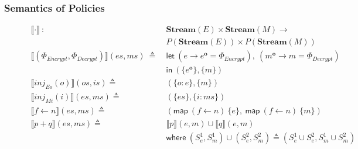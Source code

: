 \documentclass[12pt, letterpaper]{article}
\newcommand\interp[1]{\llbracket #1 \rrbracket}
\newcommand\obf[1]{#1^\mathbf{o}}
\begin{document}
      \subsubsection{Semantics of Policies}\label{sec:spec:sem:pol}
        \begin{figure}
          \centering
          \begin{align*} 
            \interp { \cdot }\ 
              :\ \ &
              \mathbf{Stream}(E)\times \mathbf{Stream}(M) \rightarrow \\
              & P(\mathbf{Stream}(E))\times P(\mathbf{Stream}(M)) 
              \\
            \interp {(\Phi_{Encrypt}, \Phi_{Decrypt})}(\mathit{es}, \mathit{ms})\
              \triangleq\
              & \mathsf{let}\ (e \rightarrow \obf{e} = \Phi_{Encrypt}),
                            \ (\obf{m} \rightarrow m = \Phi_{Decrypt})\\
              & \mathsf{in}\
              (\{\mathit{\obf{e}}\}, \{\mathit{m}\})
              \\
            \interp { inj_{Eo}(o) }(\mathit{os}, \mathit{is})
              \triangleq\ &
              (\{\mathit{o : e}\}, \{\mathit{m}\}) 
              \\
            \interp { inj_{Mi}(i) }(\mathit{es}, \mathit{ms})
              \triangleq\ &
              (\{\mathit{es}\},\{ \mathit{i : ms}\})
              \\
            \interp { f \leftarrow n }(es, ms)
              \triangleq\ &
              (\mathsf{map}\ (f\leftarrow n)\ \{e\},\
               \mathsf{map}\ (f\leftarrow n)\ \{m\})
              \\ %
            \interp { p + q }(\mathit{es}, \mathit{ms})
              \triangleq\ &
              \interp { p }(\mathit{e}, \mathit{m})\cup
              \interp { q }(\mathit{e}, \mathit{m}) \\
              &\mathsf{where}\ (S_e^1, S_m^1)\cup (S_e^2, S_m^2)\triangleq
                (S_e^1\cup S_e^2, S_m^1\cup S_m^2)\\

\end{align*}
\end{figure}
\end{document}
